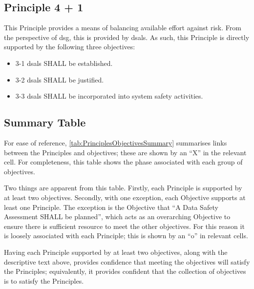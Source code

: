 \subsection{Principle 4 + 1}

This Principle provides a means of balancing available effort against risk. From the perspective of \gls{dsg}, this is provided by \glspl{dsal}. As such, this Principle is directly supported by the following three objectives:

\begin{itemize}
	\item \textcolor{dsiwgAccentColour}{3-1} \Glspl{dsal} SHALL be established.
	\item \textcolor{dsiwgAccentColour}{3-2} \Glspl{dsal} SHALL be justified.
	\item \textcolor{dsiwgAccentColour}{3-3} \Glspl{dsal} SHALL be incorporated into system safety activities.
\end{itemize}


\subsection{Summary Table}

For ease of reference, \autoref{tab:PrinciplesObjectivesSummary} summarises links between the Principles and objectives; these are shown by an ``X'' in the relevant cell. For completeness, this table shows the phase associated with each group of objectives. 

Two things are apparent from this table. Firstly, each Principle is supported by at least two objectives. Secondly, with one exception, each Objective supports at least one Principle. The exception is the Objective that ``A Data Safety Assessment SHALL be planned'', which acts as an overarching Objective to ensure there is sufficient resource to meet the other objectives. For this reason it is loosely associated with each Principle; this is shown by an ``o'' in relevant cells.

Having each Principle supported by at least two objectives, along with the descriptive text above, provides confidence that meeting the objectives will satisfy the Principles; equivalently, it provides confident that the collection of objectives is  to satisfy the Principles. 

